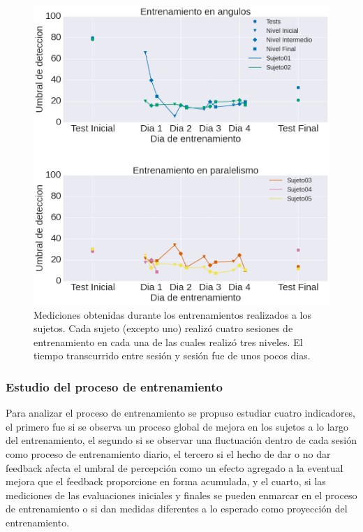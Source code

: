 \documentclass{article}
\numberwithin{figure}{section}
\begin{document}
    
    \begin{figure}
        \center
        \includegraphics[width=\textwidth]{Imagenes/TransferenciaEntrenamientoNuevo.png}
        \caption{Mediciones obtenidas durante los entrenamientos realizados a los sujetos. Cada sujeto (excepto uno) realizó cuatro sesiones de entrenamiento en cada una de las cuales realizó tres niveles. El tiempo transcurrido entre sesión y sesión fue de unos pocos dias.}
        \label{fig:Exp2_Entrenamiento}
    \end{figure}  


    \subsubsection{Estudio del proceso de entrenamiento} \label{seccion:Exp2}
    
    Para analizar el proceso de entrenamiento se propuso estudiar cuatro indicadores, el primero fue si se observa un proceso global de mejora en los sujetos a lo largo del entrenamiento, el segundo si se observar una fluctuación dentro de cada sesión como proceso de entrenamiento diario, el tercero si el hecho de dar o no dar feedback afecta el umbral de percepción como un efecto agregado a la eventual mejora que el feedback proporcione en forma acumulada, y el cuarto, si las mediciones de las evaluaciones iniciales y finales se pueden enmarcar en el proceso de entrenamiento o si dan medidas diferentes a lo esperado como proyección del entrenamiento. 
    
\end{document}
